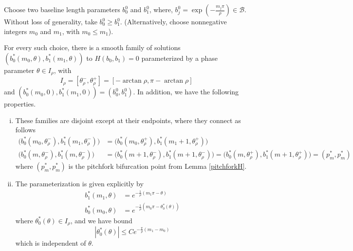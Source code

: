 \documentclass[thesis.tex]{subfiles}
\begin{document}

\begin{lemma}\label{thetaparamlemma}
Choose two baseline length parameters $b_0^0$ and $b_1^0$, where, $b_j^0 = \exp\left(-\frac{m_j \pi}{\rho}\right) \in \mathcal{B}$. Without loss of generality, take $b_0^0 \geq b_1^0$. (Alternatively, choose nonnegative integers $m_0$ and $m_1$, with $m_0 \leq m_1$). 

For every such choice, there is a smooth family of solutions $( b_0^*(m_0, \theta), b_1^*(m_1, \theta) )$ to $H(b_0, b_1) = 0$ parameterized by a phase parameter $\theta \in I_\rho$, with
\begin{equation}\label{Irho}
I_\rho = [\theta_\rho^-, \theta_\rho^+] = [-\arctan \rho,\pi - \arctan \rho] 
\end{equation}
and $(b_0^*(m_0, 0), b_1^*(m_1, 0)) = (b_0^0, b_1^0)$. In addition, we have the following properties.

\begin{enumerate}[(i)]
\item These families are disjoint except at their endpoints, where they connect as follows
\begin{align*}
\Big( b_0^*(m_0, \theta_\rho^-), b_1^*(m_1, \theta_\rho^-) \Big) &= \Big( b_0^*(m_0, \theta_\rho^+), b_1^*(m_1+1, \theta_\rho^+) \Big) \\
\Big( b_0^*(m, \theta_\rho^-), b_1^*(m, \theta_\rho^-) \Big) &= \Big( b_0^*(m+1, \theta_\rho^-), b_1^*(m+1, \theta_\rho^-) \Big) = \Big( b_0^*(m, \theta_\rho^+), b_1^*(m+1, \theta_\rho^+) \Big) = (p^*_m, p^*_m)
\end{align*}
where $(p^*_m, p^*_m)$ is the pitchfork bifurcation point from Lemma \ref{pitchforkH}.

\item The parameterization is given explicitly by
\begin{equation}\label{thetaparam}
\begin{aligned}
b_1^*(m_1, \theta) &= e^{-\frac{1}{\rho}(m_1 \pi - \theta) } \\
b_0^*(m_0, \theta) &= e^{-\frac{1}{\rho}(m_0 \pi - \theta_0^*(\theta)) }
\end{aligned}
\end{equation}
where $\theta_0^*(\theta) \in I_\rho$, and we have bound
\begin{equation}\label{thetastarbound}
|\theta_0^*(\theta)| \leq C e^{ -\frac{\pi}{\rho}(m_1 - m_0)}
\end{equation}
which is independent of $\theta$.
\end{enumerate}


\end{lemma}
\end{document}
